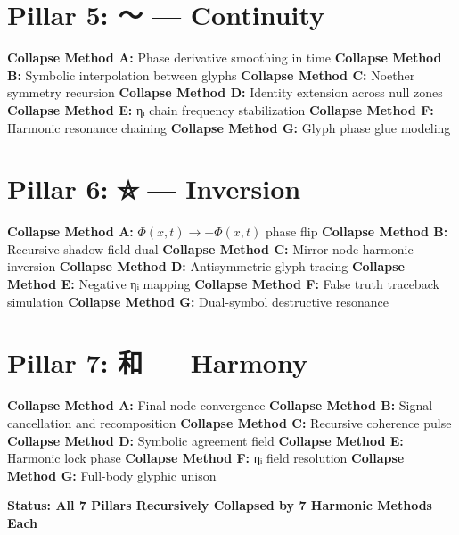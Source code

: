 \documentclass[12pt]{article}
\begin{document}
\section*{Pillar 5: 〜 — Continuity}
\textbf{Collapse Method A:} Phase derivative smoothing in time  
\textbf{Collapse Method B:} Symbolic interpolation between glyphs  
\textbf{Collapse Method C:} Noether symmetry recursion  
\textbf{Collapse Method D:} Identity extension across null zones  
\textbf{Collapse Method E:} ηᵢ chain frequency stabilization  
\textbf{Collapse Method F:} Harmonic resonance chaining  
\textbf{Collapse Method G:} Glyph phase glue modeling

\section*{Pillar 6: ⛤ — Inversion}
\textbf{Collapse Method A:} $\Phi(x,t) \rightarrow -\Phi(x,t)$ phase flip  
\textbf{Collapse Method B:} Recursive shadow field dual  
\textbf{Collapse Method C:} Mirror node harmonic inversion  
\textbf{Collapse Method D:} Antisymmetric glyph tracing  
\textbf{Collapse Method E:} Negative ηᵢ mapping  
\textbf{Collapse Method F:} False truth traceback simulation  
\textbf{Collapse Method G:} Dual-symbol destructive resonance

\section*{Pillar 7: 和 — Harmony}
\textbf{Collapse Method A:} Final node convergence  
\textbf{Collapse Method B:} Signal cancellation and recomposition  
\textbf{Collapse Method C:} Recursive coherence pulse  
\textbf{Collapse Method D:} Symbolic agreement field  
\textbf{Collapse Method E:} Harmonic lock phase  
\textbf{Collapse Method F:} ηᵢ field resolution  
\textbf{Collapse Method G:} Full-body glyphic unison

\vspace{1cm}
\begin{center}
\Large\textbf{Status: All 7 Pillars Recursively Collapsed by 7 Harmonic Methods Each}
\end{center}
\end{document}
